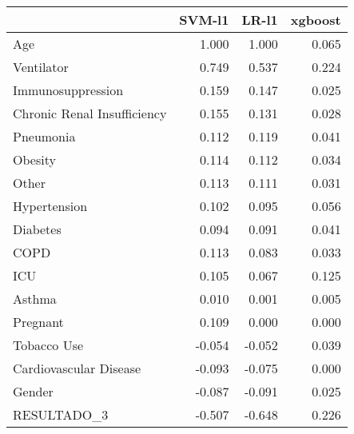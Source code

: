 \begin{tabular}{lrrr}
\toprule
{} &  SVM-l1 &  LR-l1 &  xgboost \\
\midrule
Age                         &   1.000 &  1.000 &    0.065 \\
Ventilator                  &   0.749 &  0.537 &    0.224 \\
Immunosuppression           &   0.159 &  0.147 &    0.025 \\
Chronic Renal Insufficiency &   0.155 &  0.131 &    0.028 \\
Pneumonia                   &   0.112 &  0.119 &    0.041 \\
Obesity                     &   0.114 &  0.112 &    0.034 \\
Other                       &   0.113 &  0.111 &    0.031 \\
Hypertension                &   0.102 &  0.095 &    0.056 \\
Diabetes                    &   0.094 &  0.091 &    0.041 \\
COPD                        &   0.113 &  0.083 &    0.033 \\
ICU                         &   0.105 &  0.067 &    0.125 \\
Asthma                      &   0.010 &  0.001 &    0.005 \\
Pregnant                    &   0.109 &  0.000 &    0.000 \\
Tobacco Use                 &  -0.054 & -0.052 &    0.039 \\
Cardiovascular Disease      &  -0.093 & -0.075 &    0.000 \\
Gender                      &  -0.087 & -0.091 &    0.025 \\
RESULTADO\_3                 &  -0.507 & -0.648 &    0.226 \\
\bottomrule
\end{tabular}
